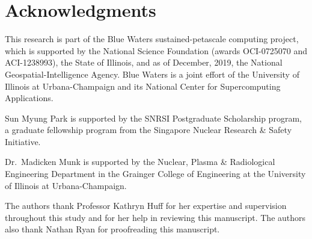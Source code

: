 \section*{Acknowledgments}

This research is part of the Blue Waters sustained-petascale computing project,
which is supported by the National Science Foundation (awards OCI-0725070 and
ACI-1238993), the State of Illinois, and as of December, 2019, the National
Geospatial-Intelligence Agency. Blue Waters is a joint effort of the University
of Illinois at Urbana-Champaign and its National Center for Supercomputing
Applications.

Sun Myung Park is supported by the SNRSI Postgraduate Scholarship program, a
graduate fellowship program from the Singapore Nuclear Research \& Safety
Initiative.

Dr.\ Madicken Munk is supported by the Nuclear, Plasma \& Radiological
Engineering Department in the Grainger College of Engineering at the University
of Illinois at Urbana-Champaign.

The authors thank Professor Kathryn Huff for her expertise and supervision
throughout this study and for her help in reviewing this manuscript. The authors
also thank Nathan Ryan for proofreading this manuscript.
